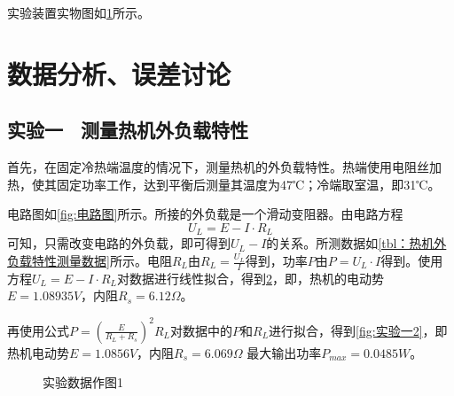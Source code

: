 \documentclass[dvipsnames, svgnames,a4paper,11pt]{article}
\begin{document}
    \clearpage
    实验装置实物图如\cref{fig:热机}所示。

    \begin{figure}[htbp]
        \centering
        \hfill
        \hfill
        \caption{}
        \label{fig:热机}
    \end{figure}







\clearpage
\section{数据分析、误差讨论}

    \subsection{实验一 \ 测量热机外负载特性}

        首先，在固定冷热端温度的情况下，测量热机的外负载特性。热端使用电阻丝加热，使其固定功率工作，达到平衡后测量其温度为47℃；冷端取室温，即31℃。
        
        电路图如\cref{fig:电路图}所示。所接的外负载是一个滑动变阻器。由电路方程
        \[
            U_L = E - I \cdot R_L
        \]
        可知，只需改变电路的外负载，即可得到$U_L - I$的关系。所测数据如\cref{tbl：热机外负载特性测量数据}所示。电阻$R_L$由$R_L = \frac{U_L}{I}$得到，功率$P$由$P = U_L \cdot I$得到。使用方程$ U_L = E - I \cdot R_L $对数据进行线性拟合，得到\cref{fig:实验一1}，即，热机的电动势$E = 1.08935 V$，内阻$R_s = 6.12 \Omega $。

        再使用公式$ P = (\frac{E}{R_L + R_s})^2 R_L $对数据中的$P$和$R_L$进行拟合，得到\cref{fig:实验一2}，即热机电动势$E = 1.0856 V $，内阻$R_s = 6.069 \Omega $
        最大输出功率$P_{max} = 0.0485W $。




        \begin{figure}[htbp]
            \centering
            \hfill
            \caption{实验数据作图1}
            \label{fig:实验一1}
        \end{figure}
\end{document}
